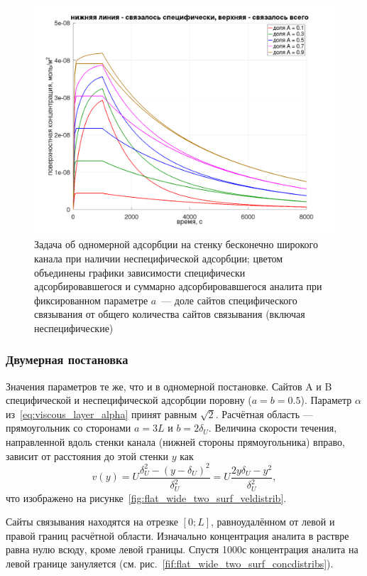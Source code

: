 \documentclass[oneside,final,12pt]{extreport}
\begin{document}
\begin{figure}
  \centering
  \includegraphics[width=.7\textwidth]{pic/flat_wide_twosurf_fracs_a_sum}

  \caption{%
    \label{fig:wide_two_surf_fracs_a_sum}%
    Задача об одномерной адсорбции на стенку бесконечно широкого канала
    при наличии неспецифической адсорбции;
    цветом объединены графики зависимости специфически адсорбировавшегося и
    суммарно адсорбировавшегося аналита при фиксированном параметре $a$~---
    доле сайтов специфического связывания от общего количества сайтов связывания
    (включая неспецифические)
  }

\end{figure}


\subsubsection*{Двумерная постановка}
Значения параметров те же, что и в одномерной постановке.
Сайтов A и B специфической и неспецифической адсорбции поровну ($a = b = 0.5$).
Параметр $\alpha$ из~\eqref{eq:viscous_layer_alpha} принят равным $\sqrt{2}$.
Расчётная область --- прямоугольник со сторонами $a = 3 L$ и $b = 2 \delta_U$.
Величина скорости течения, направленной вдоль стенки канала
(нижней стороны прямоугольника) вправо,
зависит от расстояния до этой стенки $y$ как
\begin{equation}
  v(y) = U \frac{\delta_U^2 - \left(y - \delta_U\right)^2}{\delta_U^2}
       = U \frac{2 y \delta_U - y^2}{\delta_U^2},
  \label{eq:flat_wide_plate_v(y)}
\end{equation}
что изображено на рисунке~\ref{fig:flat_wide_two_surf_veldistrib}.

Сайты связывания находятся на отрезке $\left[0;L\right]$,
равноудалённом от левой и правой границ расчётной области.
Изначально концентрация аналита в раствре равна нулю всюду, кроме левой границы.
Спустя 1000с концентрация аналита на левой границе зануляется
(см. рис.~\ref{fif:flat_wide_two_surf_concdistribs}).
\end{document}
